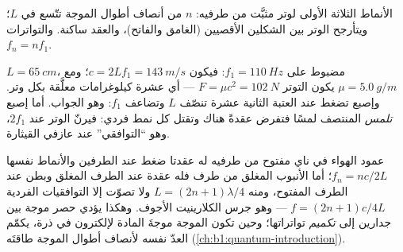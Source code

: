 \begin{omfigure}

{\small الأنماط الثلاثة الأولى لوتر مثبَّت من طرفيه: $n$
من أنصاف أطوال الموجة تتّسع في $L$؛ ويتأرجح الوتر بين الشكلين
الأقصيين (الغامق والفاتح)، والعقد ساكنة. والتواترات $f_n = nf_1$.}
\end{omfigure}

\begin{example}\label{ex:b1:wave-propagation:guitar}
$L = \qty{65}{cm}$، مضبوط على $f_1 = \qty{110}{Hz}$: فيكون $c = 2Lf_1 =
\qty{143}{m/s}$؛ ومع $\mu = \qty{5.0}{g/m}$ يكون التوتر $F = \mu c^2
= \qty{102}{N}$ --- أي عشرة كيلوغرامات معلَّقة بكل وتر. وإصبع
تضغط عند العتبة الثانية عشرة تنصّف $L$ وتضاعف $f_1$: وهو الجواب.
أما إصبع \emph{تلمس} المنتصف لمسًا فتفرض عقدةً هناك
وتقتل كل نمط فردي: فيرنّ الوتر عند $2f_1$، وهو ``التوافقي'' عند
عازفي القيثارة.
\end{example}

\begin{remark}\label{rem:b1:wave-propagation:pipes}
عمود الهواء في ناي مفتوح من طرفيه له عقدتا ضغط عند
الطرفين والأنماط نفسها $f_n = nc/2L$؛ أما الأنبوب المغلق من طرف
فله عقدة عند الطرف المغلق وبطن عند الطرف المفتوح، ومنه
$L = (2n + 1)\lambda/4$ ولا تصوّت إلا التوافقيات الفردية $f = (2n + 1)c/4L$
--- وهو جرس الكلارينيت الأجوف. وهكذا يؤدي حصر موجة بين
جدارين إلى \emph{تكميم} تواتراتها؛ وحين تكون الموجة موجةَ المادة
لإلكترون في ذرة، يكمّم العدّ نفسه لأنصاف أطوال الموجة طاقتَه
(\cref{ch:b1:quantum-introduction}).
\end{remark}

